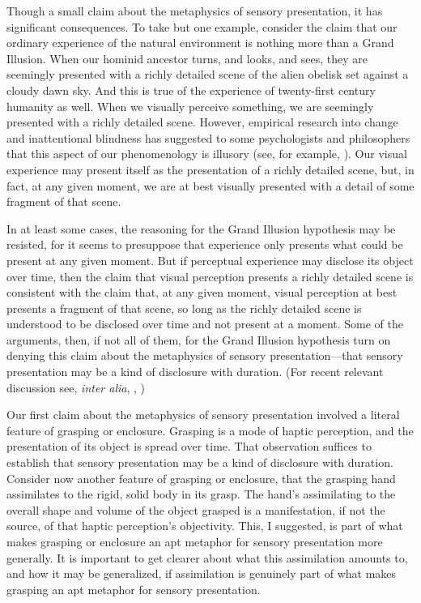 Though a small claim about the metaphysics of sensory presentation, it has significant consequences. To take but one example, consider the claim that our ordinary experience of the natural environment is nothing more than a Grand Illusion. When our hominid ancestor turns, and looks, and sees, they are seemingly presented with a richly detailed scene of the alien obelisk set against a cloudy dawn sky. And this is true of the experience of twenty-first century humanity as well. When we visually perceive something, we are seemingly presented with a richly detailed scene. However, empirical research into change and inattentional blindness has suggested to some psychologists and philosophers that this aspect of our phenomenology is illusory (see, for example, \citealt{Blackmore:1995an,Simons:1999wf}). Our visual experience may present itself as the presentation of a richly detailed scene, but, in fact, at any given moment, we are at best visually presented with a detail of some fragment of that scene. 

In at least some cases, the reasoning for the Grand Illusion hypothesis may be resisted, for it seems to presuppose that experience only presents what could be present at any given moment. But if perceptual experience may disclose its object over time, then the claim that visual perception presents a richly detailed scene is consistent with the claim that, at any given moment, visual perception at best presents a fragment of that scene, so long as the richly detailed scene is understood to be disclosed over time and not present at a moment. Some of the arguments, then, if not all of them, for the Grand Illusion hypothesis turn on denying this claim about the metaphysics of sensory presentation---that sensory presentation may be a kind of disclosure with duration. (For recent relevant discussion see, \emph{inter alia}, \citealt{Noe:2004fk}, \citealt[72--74]{Campbell:2014aa})

Our first claim about the metaphysics of sensory presentation involved a literal feature of grasping or enclosure. Grasping is a mode of haptic perception, and the presentation of its object is spread over time. That observation suffices to establish that sensory presentation may be a kind of disclosure with duration. Consider now another feature of grasping or enclosure, that the grasping hand assimilates to the rigid, solid body in its grasp. The hand's assimilating to the overall shape and volume of the object grasped is a manifestation, if not the source, of that haptic perception's objectivity. This, I suggested, is part of what makes grasping or enclosure an apt metaphor for sensory presentation more generally. It is important to get clearer about what this assimilation amounts to, and how it may be generalized, if assimilation is genuinely part of what makes grasping an apt metaphor for sensory presentation.

